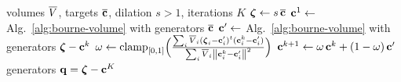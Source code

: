\documentclass[main.tex]{subfiles}
\begin{document}
\begin{algorithm}[H]
  \caption{Projection--dilation fitting by \citet{Bourne2026ConvexOrder}, Frank--Wolfe variant.}
  \label{alg:bourne2026-fw}
  \begin{algorithmic}[1]
    \Require volumes $\overline{V}$, targets $\overline{\mathbf{c}}$, dilation $s \!>\! 1$, iterations $K$
    \State $\boldsymbol{\zeta} \gets s\,\overline{\mathbf{c}}$
    \State $\mathbf{c}^1 \gets$ Alg.~\ref{alg:bourne-volume} with generators $\overline{\mathbf{c}}$ 
      \State $\mathbf{c}' \gets$ Alg.~\ref{alg:bourne-volume} with generators $\boldsymbol{\zeta} - \mathbf{c}^k$ 
      \State $\omega \gets \operatorname{clamp}_{[0,1]} \Bigl( \frac{\sum_i \overline{V}_i (\boldsymbol{\zeta}_i - \mathbf{c}'_i)^{t} (\mathbf{c}^k_i - \mathbf{c}'_i)}{\sum_i \overline{V}_i \left\lVert \mathbf{c}^k_i - \mathbf{c}'_i \right\rVert^2} \Bigr)$ 
      \State $\mathbf{c}^{k+1} \gets \omega\,\mathbf{c}^k + (1 - \omega)\,\mathbf{c}'$
    \EndFor
    \State \Return generators $\mathbf{q} = \boldsymbol{\zeta} - \mathbf{c}^{K}$
  \end{algorithmic}
\end{algorithm}
\end{document}
